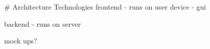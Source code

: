 \begin{markdown}


# Architecture Technologies
frontend
- runs on user device
- gui

backend
- runs on server

mock ups?



\end{markdown}
